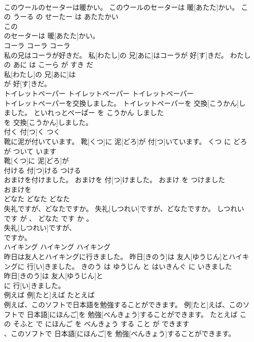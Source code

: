\documentclass[8pt]{extreport}
\begin{document}
\begin{CJK}{UTF8}{min}
\\	このウールのセーターは暖かい。	このウールのセーターは 暖[あたた]かい。	この うーる の せーたー は あたたかい	
\\	この
\\	のセーターは 暖[あたた]かい。			
\\	コーラ	コーラ	コーラ	
\\	私の兄はコーラが好きだ。	私[わたし]の 兄[あに]はコーラが 好[す]きだ。	わたし の あに は こーら が すき だ	
\\	私[わたし]の 兄[あに]は
\\	が 好[す]きだ。			
\\	トイレットペーパー	トイレットペーパー	トイレットペーパー	
\\	トイレットペーパーを交換しました。	トイレットペーパーを 交換[こうかん]しました。	といれっとぺーぱー を こうかん しました	
\\	を 交換[こうかん]しました。			
\\	付く	付[つ]く	つく	
\\	靴に泥が付いています。	靴[くつ]に 泥[どろ]が 付[つ]いています。	くつ に どろ が ついて います	
\\	靴[くつ]に 泥[どろ]が
\\	付ける	付[つ]ける	つける	
\\	おまけを付けました。	おまけを 付[つ]けました。	おまけ を つけました	
\\	おまけを
\\	どなた	どなた	どなた	
\\	失礼ですが、どなたですか。	失礼[しつれい]ですが、どなたですか。	しつれい です が 、 どなた です か 。	
\\	失礼[しつれい]ですが、
\\	ですか。			
\\	ハイキング	ハイキング	ハイキング	
\\	昨日は友人とハイキングに行きました。	昨日[きのう]は 友人[ゆうじん]とハイキングに 行[い]きました。	きのう は ゆうじん と はいきんぐ に いきました	
\\	昨日[きのう]は 友人[ゆうじん]と
\\	に 行[い]きました。			
\\	例えば	例[たと]えば	たとえば	
\\	例えば、このソフトで日本語を勉強することができます。	例[たと]えば、このソフトで 日本語[にほんご]を 勉強[べんきょう]することができます。	たとえば この そふと で にほんご を べんきょう する こと が できます	
\\	、このソフトで 日本語[にほんご]を 勉強[べんきょう]することができます。			

\end{CJK}
\end{document}
